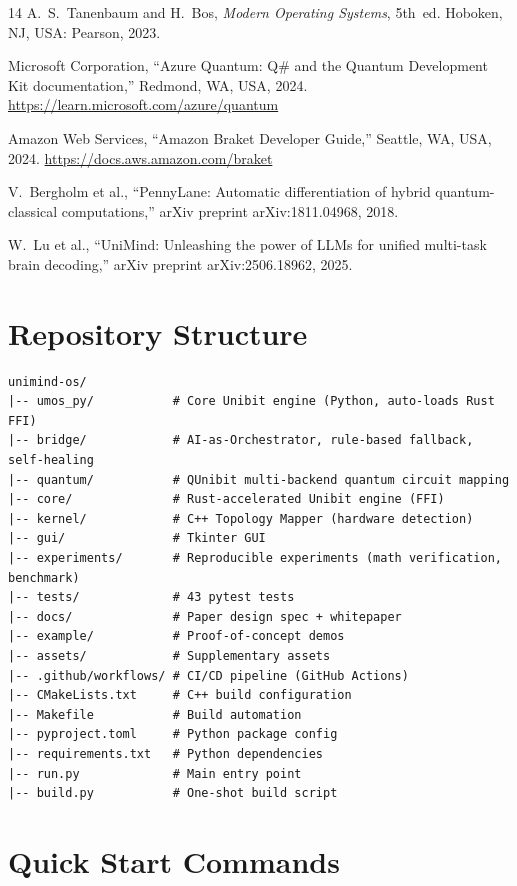 ﻿\documentclass[12pt,a4paper]{article}
\begin{document}
\begin{thebibliography}{14}
A.~S.~Tanenbaum and H.~Bos,
\textit{Modern Operating Systems}, 5th~ed.
Hoboken, NJ, USA: Pearson, 2023.

Microsoft Corporation,
``Azure Quantum: Q\# and the Quantum Development Kit documentation,''
Redmond, WA, USA, 2024.
\url{https://learn.microsoft.com/azure/quantum}

Amazon Web Services,
``Amazon Braket Developer Guide,''
Seattle, WA, USA, 2024.
\url{https://docs.aws.amazon.com/braket}

V.~Bergholm et al.,
``PennyLane: Automatic differentiation of hybrid quantum-classical computations,''
arXiv preprint arXiv:1811.04968, 2018.

W.~Lu et al.,
``UniMind: Unleashing the power of LLMs for unified multi-task brain decoding,''
arXiv preprint arXiv:2506.18962, 2025.

\end{thebibliography}


\newpage
\appendix

\section{Repository Structure}

\begin{verbatim}
unimind-os/
|-- umos_py/           # Core Unibit engine (Python, auto-loads Rust FFI)
|-- bridge/            # AI-as-Orchestrator, rule-based fallback, self-healing
|-- quantum/           # QUnibit multi-backend quantum circuit mapping
|-- core/              # Rust-accelerated Unibit engine (FFI)
|-- kernel/            # C++ Topology Mapper (hardware detection)
|-- gui/               # Tkinter GUI
|-- experiments/       # Reproducible experiments (math verification, benchmark)
|-- tests/             # 43 pytest tests
|-- docs/              # Paper design spec + whitepaper
|-- example/           # Proof-of-concept demos
|-- assets/            # Supplementary assets
|-- .github/workflows/ # CI/CD pipeline (GitHub Actions)
|-- CMakeLists.txt     # C++ build configuration
|-- Makefile           # Build automation
|-- pyproject.toml     # Python package config
|-- requirements.txt   # Python dependencies
|-- run.py             # Main entry point
|-- build.py           # One-shot build script
\end{verbatim}

\section{Quick Start Commands}
\end{document}
